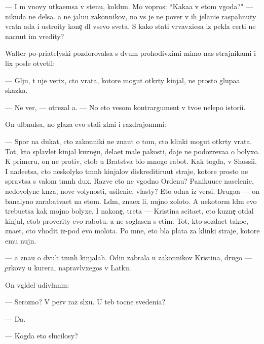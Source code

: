 \documentclass[10pt]{book}
\begin{document}
— I m{\yi} vnovy ut{\yi}ka{\y}emsa v stenu, koldun. Mo{\y} vopros: ``Kaka{\y}a v etom v{\yi}goda?" — nikuda ne delsa. {\Y}a ne jalu{\y}u zakonnikov, no vs{\e} je ne pover{\iu} v ih jelani{\y}e raspahnuty vrata ada i ustro{\y}ity kone{\c} dl{\ia} vsevo sveta. S kako{\y} stati v{\yi}rvavxi{\y}esa iz pekla certi ne nacnut im vredity?

Walter po-pri{\y}atelyski pozdorovalsa s dvum{\ia} prohodivximi mimo nas strajnikami i lix posle otvetil:

— Gl{\ia}ju, t{\yi} uje verix, cto vrata, kotor{\yi}{\y}e mogut otkr{\yi}ty kinjal{\yi}, ne prosto glupa{\y}a skazka.

— Ne ver{\iu}, — otrezal {\y}a. — No eto vesom{\yi}{\y} kontrargument v tvo{\y}e{\y} nelepo{\y} istori{\y}i.

On ul{\yi}bnulsa, no glaza {\y}evo stali zl{\yi}mi i razdrajonn{\yi}mi:

— Spor{\iu} na dukat, cto zakonniki ne zna{\y}ut o tom, cto klinki mogut otkr{\yi}ty vrata. Tot, kto splavl{\ia}{\y}et kinjal{\yi} kuzne{\c}u, dela{\y}et mal{\yi}{\y}e pakosti, daje ne podozreva{\y}a o bolyxo{\y}. K primeru, on ne protiv, ctob{\yi} u Bratstva b{\yi}lo mnogo rabot{\yi}. Kak togda, v Shossi{\y}i. I nade{\y}etsa, cto neskolyko t{\e}mn{\yi}h kinjalov diskreditiru{\y}ut straje{\y}, kotor{\yi}{\y}e prosto ne sprav{\ia}tsa s valom t{\e}mn{\yi}h dux. Razve eto ne v{\yi}godno Ordenu? Paniku{\y}u{\x}e{\y}e naseleni{\y}e, nedovolyn{\yi}{\y}e kn{\ia}z{\y}a, nov{\yi}{\y}e volynosti, usileni{\y}e, vlasty? Eto odna iz versi{\y}. Druga{\y}a — on banalyno zarabat{\yi}va{\y}et na etom. L{\iu}d{\ia}m, zna{\y}ex li, nujno zoloto. A nekotor{\yi}m l{\iu}d{\ia}m {\y}evo trebu{\y}etsa kak mojno bolyxe. I nakone{\c}, tret{\y}a — Kristina scita{\y}et, cto kuzne{\c} otdal kinjal, ctob{\yi} proverity {\y}evo rabotu. {\Y}a ne soglasen s etim. Tot, kto sozda{\y}et tako{\y}e, zna{\y}et, cto v{\yi}hodit iz-pod {\y}evo molota. Po mne, eto b{\yi}la plata za klinki straje{\y}, kotor{\yi}{\y}e {\y}emu nujn{\yi}.

— {\Y}a zna{\y}u o dvuh t{\e}mn{\yi}h kinjalah. Odin zabrala u zakonnikov Kristina, drugo{\y} — {\c}erkovy u kur{\y}era, napravl{\ia}vxegos{\ia} v Latku.

On v{\yi}gl{\ia}del udivl{\e}nn{\yi}m:

— Ser{\y}ozno? V perv{\yi}{\y} raz sl{\yi}xu. U teb{\ia} tocn{\yi}{\y}e svedeni{\y}a?

— Da.

— Kogda eto slucilosy?
\end{document}
